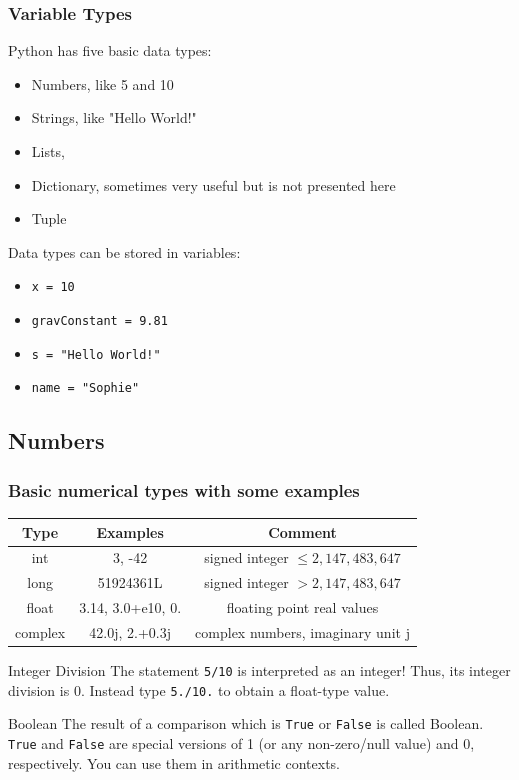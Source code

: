 \documentclass{beamer}
\begin{document}
\begin{frame}
\frametitle{Variable Types}
	Python has five basic data types:
	\begin{itemize}
		\item Numbers, like 5 and 10
		\item Strings, like "Hello World!"
		\item Lists, 
		\item Dictionary, sometimes very useful but is not presented here
		\item Tuple
	\end{itemize}
	Data types can be stored in variables:
	\begin{itemize}
		\item  \texttt{x = 10}
		\item  \texttt{gravConstant = 9.81}
		\item  \texttt{s = "Hello World!"}
		\item  \texttt{name = "Sophie"}
	\end{itemize}
\end{frame}

\subsection{Numbers}

\begin{frame}
\frametitle{Basic numerical types with some examples}
	\begin{tabular}{c|c|c}
		Type & Examples & Comment \\ \hline
		int  & 3, -42 &  signed integer $ \leq 2,147,483,647$\\
		long & 51924361L & signed integer $>2,147,483,647$ \\
		float & 3.14, 3.0+e10, 0. & floating point real values \\
		complex & 42.0j, 2.+0.3j & complex numbers, imaginary unit j
 	\end{tabular}
 	
 	\begin{alertblock}{Integer Division}
 		The statement \texttt{5/10} is interpreted as an integer! Thus, its integer division is 0. Instead type 			\texttt{5./10.} to obtain a float-type value.
 	\end{alertblock}
 	\begin{block}{Boolean}
 		The result of a comparison which is \texttt{True} or \texttt{False} is called Boolean. \texttt{True} and 			\texttt{False} are special versions of 1 (or any non-zero/null value) and 0, respectively. You can use them in arithmetic contexts.
 	\end{block}	
\end{frame}
\end{document}
